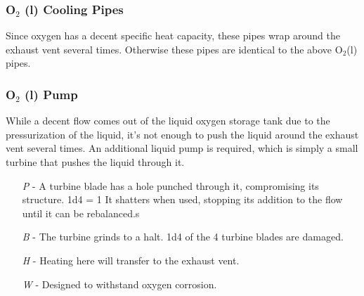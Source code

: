 \documentclass[a4paper]{article}
\begin{document}
\vspace{-0.5cm} \hspace{-18pt} \subsubsection{O$_2$ (l) Cooling Pipes} \label{engine_o2_cooling} \vspace{-0.2cm}
Since oxygen has a decent specific heat capacity, these pipes wrap around the exhaust vent several times. Otherwise these pipes are identical to the above O$_2$(l) pipes.

\vspace{-0.5cm} \hspace{-18pt} \subsubsection{O$_2$ (l) Pump} \label{engine_o2_pump} \vspace{-0.2cm}
While a decent flow comes out of the liquid oxygen storage tank due to the pressurization of the liquid, it's not enough to push the liquid around the exhaust vent several times. An additional liquid pump is required, which is simply a small turbine that pushes the liquid through it.
\begin{enumerate}
\item [\textit{P}] - A turbine blade has a hole punched through it, compromising its structure. \newline \hspace*{3pt} 1d4 = 1 It shatters when used, stopping its addition to the flow until it can be rebalanced.s
\item [\textit{B}] - The turbine grinds to a halt. 1d4 of the 4 turbine blades are damaged.
\item [\textit{H}] - Heating here will transfer to the exhaust vent.
\item [\textit{W}] - Designed to withstand oxygen corrosion.
\end{enumerate}
\end{document}
